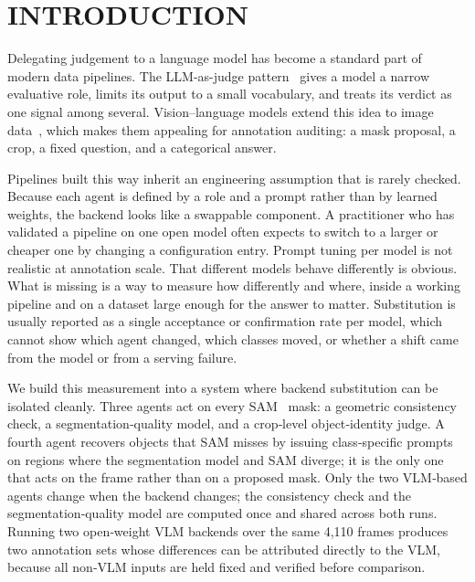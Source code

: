 \documentclass[a4paper,twoside]{article}
\begin{document}
\section{\uppercase{Introduction}}
\label{sec:introduction}

Delegating judgement to a language model has become a standard part of modern data pipelines.
The LLM-as-judge pattern~\cite{zheng2023judging} gives a model a narrow evaluative role, limits its output to a small vocabulary, and treats its verdict as one signal among several.
Vision–language models extend this idea to image data~\cite{liu2024llava,wang2024qwen2vl}, which makes them appealing for annotation auditing: a mask proposal, a crop, a fixed question, and a categorical answer.

Pipelines built this way inherit an engineering assumption that is rarely checked.
Because each agent is defined by a role and a prompt rather than by learned weights, the backend looks like a swappable component.
A practitioner who has validated a pipeline on one open model often expects to switch to a larger or cheaper one by changing a configuration entry.
Prompt tuning per model is not realistic at annotation scale.
That different models behave differently is obvious.
What is missing is a way to measure how differently and where, inside a working pipeline and on a dataset large enough for the answer to matter.
Substitution is usually reported as a single acceptance or confirmation rate per model, which cannot show which agent changed, which classes moved, or whether a shift came from the model or from a serving failure.

We build this measurement into a system where backend substitution can be isolated cleanly.
Three agents act on every SAM~\cite{kirillov2023sam} mask: a geometric consistency check, a segmentation‑quality model, and a crop‑level object‑identity judge.
A fourth agent recovers objects that SAM misses by issuing class‑specific prompts on regions where the segmentation model and SAM diverge; it is the only one that acts on the frame rather than on a proposed mask.
Only the two VLM‑based agents change when the backend changes; the consistency check and the segmentation‑quality model are computed once and shared across both runs.
Running two open‑weight VLM backends over the same 4{,}110 frames produces two annotation sets whose differences can be attributed directly to the VLM, because all non‑VLM inputs are held fixed and verified before comparison.
\end{document}
